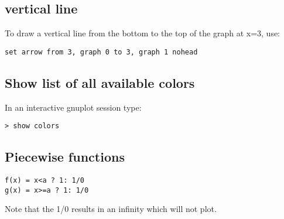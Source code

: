 \subsection*{vertical line}

To draw a vertical line from the bottom to the top of the graph at x=3, use: 
\begin{verbatim}
set arrow from 3, graph 0 to 3, graph 1 nohead
\end{verbatim}


\subsection*{Show list of all available colors}

In an interactive gnuplot session type:

\begin{verbatim}
> show colors
\end{verbatim}


\subsection*{Piecewise functions}

\begin{verbatim}
f(x) = x<a ? 1: 1/0
g(x) = x>=a ? 1: 1/0
\end{verbatim}
Note that the 1/0 results in an infinity which will not plot.





